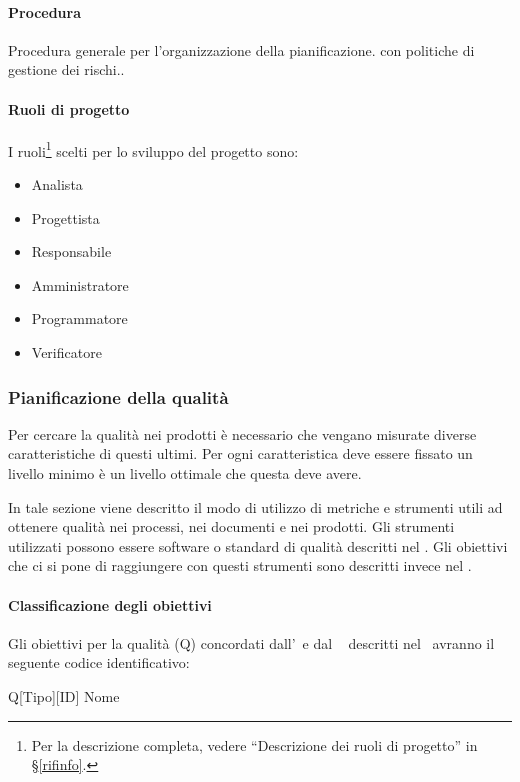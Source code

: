 			\paragraph{Procedura}
			Procedura generale per l’organizzazione della pianificazione.
			con politiche di gestione dei rischi..

			\paragraph{Ruoli di progetto}
			I ruoli\footnote{Per la descrizione completa, vedere ``Descrizione dei ruoli di progetto'' in \S\ref{rifinfo}.} scelti per lo sviluppo del progetto sono:
			\begin{itemize}[noitemsep]
				\item Analista
				\item Progettista
				\item Responsabile
				\item Amministratore
				\item Programmatore
				\item Verificatore
			\end{itemize}


		\subsubsection{Pianificazione della qualità}
		Per cercare la qualità nei prodotti è necessario che vengano misurate diverse caratteristiche di questi ultimi.
		Per ogni caratteristica deve essere fissato un livello minimo è un livello ottimale che questa deve avere.
		
		In tale sezione viene descritto il modo di utilizzo di metriche e strumenti utili ad ottenere qualità nei processi, nei documenti e nei prodotti.
		Gli strumenti utilizzati possono essere software o standard di qualità descritti nel \Doc{\PdQ}.
		Gli obiettivi che ci si pone di raggiungere con questi strumenti sono descritti invece nel \Doc{\PdQ}.
			
			\paragraph{Classificazione degli obiettivi}
			Gli obiettivi per la qualità (Q) concordati dall'\Amm~e dal \Ver~ descritti nel \PdQ~avranno il seguente codice identificativo:
			
			\begin{center}
				Q[Tipo][ID] Nome
			\end{center}
		
